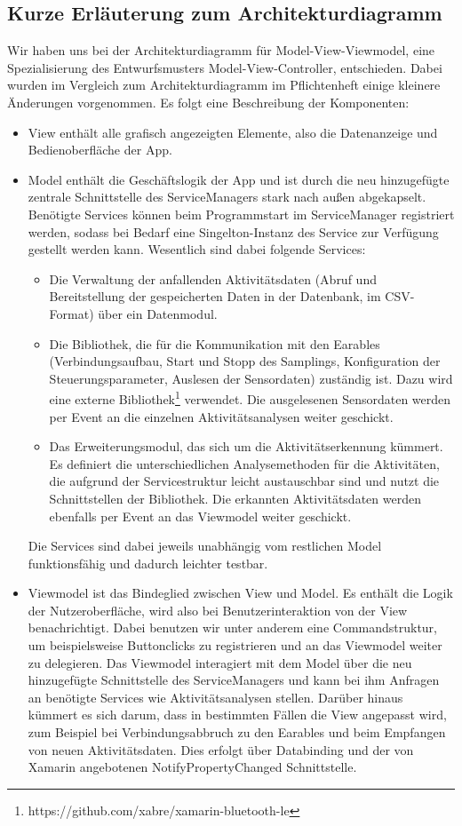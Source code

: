 \documentclass[a4paper,12pt]{article}
\begin{document}
	\subsection{Kurze Erläuterung zum Architekturdiagramm}
Wir haben uns bei der Architekturdiagramm für \textsf{Model-View-Viewmodel}, eine Spezialisierung des Entwurfsmusters Model-View-Controller, entschieden. Dabei wurden im Vergleich zum Architekturdiagramm im Pflichtenheft einige kleinere Änderungen vorgenommen. Es folgt eine Beschreibung der Komponenten:
  \begin{itemize}
  	\item \textsf{\glqq View\grqq{}} enthält alle grafisch angezeigten Elemente, also die Datenanzeige und Bedienoberfläche der App.
 	\item \textsf{\glqq Model\grqq{}} enthält die Geschäftslogik der App und ist durch die neu hinzugefügte zentrale Schnittstelle des ServiceManagers stark nach außen abgekapselt. Benötigte Services können beim Programmstart im ServiceManager registriert werden, sodass bei Bedarf eine Singelton-Instanz des Service zur Verfügung gestellt werden kann. Wesentlich sind dabei folgende Services: 
\begin{itemize}
      \item Die Verwaltung der anfallenden Aktivitätsdaten (Abruf und Bereitstellung der gespeicherten Daten in der Datenbank, im CSV-Format) über ein Datenmodul.
      \item Die Bibliothek, die für die Kommunikation mit den \Gls{Earables} (Verbindungsaufbau, Start und Stopp des Samplings, Konfiguration der \Gls{Steuerungsparameter}, Auslesen der Sensordaten) zuständig ist. Dazu wird eine externe Bibliothek\footnote{https://github.com/xabre/xamarin-bluetooth-le} verwendet. Die ausgelesenen Sensordaten werden per Event an die einzelnen Aktivitätsanalysen weiter geschickt. 
      \item Das Erweiterungsmodul, das sich um die Aktivitätserkennung kümmert. Es definiert die unterschiedlichen Analysemethoden für die Aktivitäten, die aufgrund der Servicestruktur leicht austauschbar sind und nutzt die Schnittstellen der Bibliothek. Die erkannten Aktivitätsdaten werden ebenfalls per Event an das Viewmodel weiter geschickt. 
\end{itemize}
Die Services sind dabei jeweils unabhängig vom restlichen Model funktionsfähig und dadurch leichter testbar.
\item \textsf{\glqq Viewmodel\grqq{}} ist das Bindeglied zwischen View und Model. Es enthält die Logik der Nutzeroberfläche, wird also bei Benutzerinteraktion von der View benachrichtigt. Dabei benutzen wir unter anderem eine Commandstruktur, um beispielsweise Buttonclicks zu registrieren und an das Viewmodel weiter zu delegieren. Das Viewmodel interagiert mit dem Model über die neu hinzugefügte Schnittstelle des ServiceManagers und kann bei ihm Anfragen an benötigte Services wie Aktivitätsanalysen stellen. Darüber hinaus kümmert es sich darum, dass in bestimmten Fällen die View angepasst wird, zum Beispiel bei Verbindungsabbruch zu den \Gls{Earables} und beim Empfangen von neuen Aktivitätsdaten. Dies erfolgt über Databinding und der von Xamarin angebotenen NotifyPropertyChanged Schnittstelle.
\end{itemize}
\end{document}

